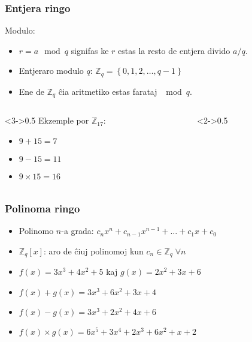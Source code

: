 \documentclass[utf8]{scrartcl}
\begin{document}
\begin{frame}
  \frametitle{Entjera ringo}

  Modulo:
  \begin{itemize}
  \item $r = a \mod q$ signifas ke $r$ estas la resto de entjera divido $a/q$.
  \item Entjeraro modulo $q$: $\mathbb{Z}_q = \left\{0, 1, 2, \ldots, q-1\right\}$
  \item Ene de $\mathbb{Z}_q$ ĉia aritmetiko estas farataj $\mod q$.
  \end{itemize}
  \begin{columns}
    \begin{column}<3->{0.5\textwidth}
      Ekzemple por $\mathbb{Z}_{17}$:
      \begin{itemize}
      \item $9 + 15 = 7$
      \item $9 - 15 = 11$
      \item $9 \times 15 = 16$
      \end{itemize}
    \end{column}
    \begin{column}<2->{0.5\textwidth}
    \end{column}
  \end{columns}
\end{frame}

\begin{frame}
  \frametitle{Polinoma ringo}
  \begin{itemize}
  \item Polinomo $n$-a grada: $c_nx^n + c_{n-1}x^{n-1} + \ldots + c_1 x + c_0$
  \item $\mathbb{Z}_q[x]$: aro de ĉiuj polinomoj kun $c_n \in \mathbb{Z}_q
    \;\forall n$

  \end{itemize}

  \vspace{2em}
  \begin{itemize}
  \item<3-> $f(x) = 3x^3 + 4x^2 + 5$ kaj $g(x) = 2x^2 + 3x + 6$
  \item<4-> $f(x) + g(x) = 3x^3 + 6x^2 + 3x + 4$
  \item<5-> $f(x) - g(x) = 3x^3 + 2x^2 + 4x + 6$
  \item<6-> $f(x) \times g(x) = 6x^5 + 3x^4 + 2x^3 + 6x^2 + x + 2$
  \end{itemize}

\end{frame}
\end{document}
